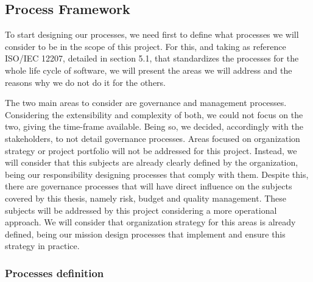 \subsection{Process Framework}

To start designing our processes, we need first to define what processes we will consider to be in the scope of this project. For this, and taking as reference ISO/IEC 12207, detailed in section 5.1, that standardizes the processes for the whole life cycle of software, we will present the areas we will address and the reasons why we do not do it for the others.\par
The two main areas to consider are governance and management processes. Considering the extensibility and complexity of both, we could not focus on the two, giving the time-frame available. Being so, we decided, accordingly with the stakeholders, to not detail governance processes. Areas focused on organization strategy or project portfolio will not be addressed for this project. Instead, we will consider that this subjects are already clearly defined by the organization, being our responsibility designing processes that comply with them. 
Despite this, there are governance processes that will have direct influence on the subjects covered by this thesis, namely risk, budget and quality management. These subjects will be addressed by this project considering a more operational approach. We will consider that organization strategy for this areas is already defined, being our mission design processes that implement and ensure this strategy in practice.\par


\subsubsection{Processes definition}



